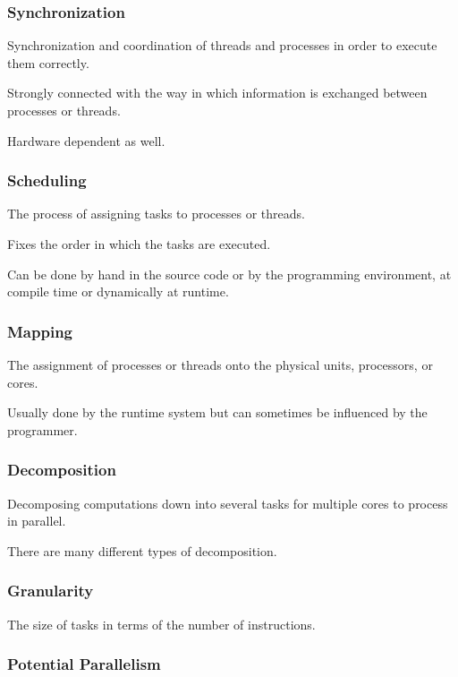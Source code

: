 \documentclass{article}
\begin{document}
\subsubsection{Synchronization}

Synchronization and coordination of threads and processes in order to execute them correctly.

Strongly connected with the way in which information is exchanged between processes or threads.

Hardware dependent as well.

\subsubsection{Scheduling}

The process of assigning tasks to processes or threads.

Fixes the order in which the tasks are executed.

Can be done by hand in the source code or by the programming environment, at compile time or dynamically at runtime.

\subsubsection{Mapping}

The assignment of processes or threads onto the physical units, processors, or cores.

Usually done by the runtime system but can sometimes be influenced by the programmer.

\subsubsection{Decomposition}

Decomposing computations down into several tasks for multiple cores to process in parallel.

There are many different types of decomposition.

\subsubsection{Granularity}

The size of tasks in terms of the number of instructions.

\subsubsection{Potential Parallelism}
\end{document}
